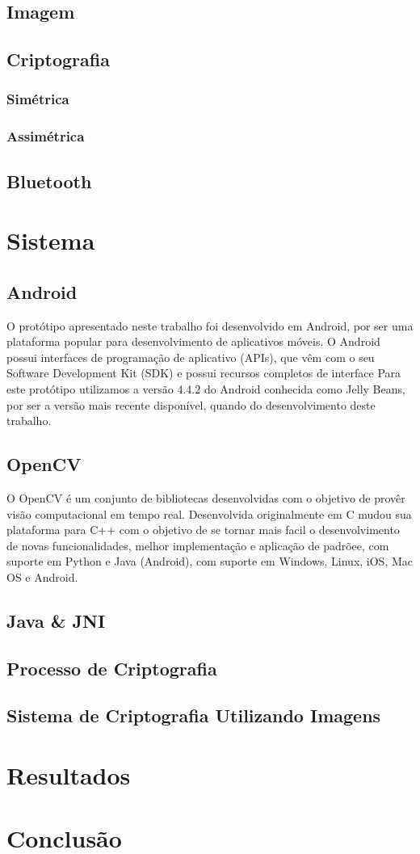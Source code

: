 \documentclass[12pt]{article}
\begin{document}
\subsection{Imagem}
\subsection{Criptografia}
\subsubsection{Simétrica}
\subsubsection{Assimétrica}
\subsection{Bluetooth}

\section{Sistema}
\subsection{Android}
O protótipo apresentado neste trabalho foi desenvolvido em Android, por ser uma plataforma popular para desenvolvimento de aplicativos móveis. O Android possui interfaces de programação de aplicativo (APIs), que vêm com o seu Software Development Kit (SDK) e possui recursos completos de interface\cite{android:2014:Online}
Para este protótipo utilizamos a versão 4.4.2 do Android conhecida como Jelly Beans, por ser a versão mais recente disponível, quando do desenvolvimento deste trabalho. 

\subsection{OpenCV}
O OpenCV é um conjunto de bibliotecas desenvolvidas com o objetivo de provêr visão computacional em tempo real. Desenvolvida originalmente em C mudou sua plataforma para C++ com o objetivo de se tornar mais facil o desenvolvimento de novas funcionalidades, melhor implementação e aplicação de padrõee, com suporte em Python e Java (Android), com suporte em Windows, Linux, iOS, Mac OS e Android.
\subsection{Java \& JNI}
\subsection{Processo de Criptografia}
\subsection{Sistema de Criptografia Utilizando Imagens}

\section{Resultados}
\section{Conclusão}




\end{document}
